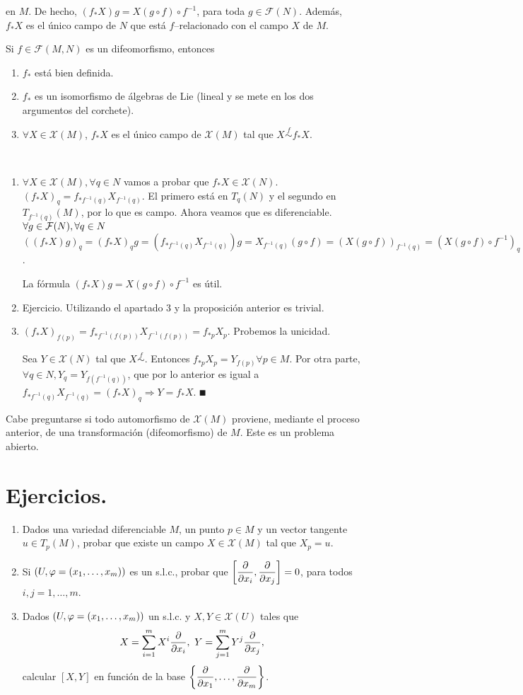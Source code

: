 \documentclass[Cursovd_portada.tex]{subfiles}
\begin{document}
en $M$. De hecho, $(f_*X)g=X(g\circ f)\circ f^{-1}$, para toda
$g\in \mathcal{F}(N)$. Además, $f_*X$ es el único campo de
$N$ que est\'a $f$--relacionado con el campo $X$ de $M$.
\begin{prop}
Si $f\in\mathcal{F}(M,N)$ es un difeomorfismo, entonces 
\begin{enumerate}
\item $f_*$ está bien definida.
\item $f_*$ es un isomorfismo de álgebras de Lie (lineal y se mete en los dos argumentos del corchete).
\item $\forall X\in\mathcal{X}(M)$, $f_*X$ es el único campo de $\mathcal{X}(M)$ tal que $X\overset{f}{\sim} f_*X$.
\end{enumerate}
\end{prop}
\begin{dem}\
\begin{enumerate}
\item $\forall X\in\mathcal{X}(M),\forall q\in N$ vamos a probar que $f_*X\in\mathcal{X}(N)$. $(f_*X)_q=f_{*f^{-1}(q)}X_{f^{-1}(q)}$. El primero está en $T_q(N)$ y el segundo en $T_{f^{-1}(q)}(M)$, por lo que es campo. Ahora veamos que es diferenciable.
$\forall g\in\mathcal{F}(N),\forall q\in N$ $((f_*X)g)_q=(f_*X)_qg=(f_{*f^{-1}(q)}X_{f^{-1}(q)})g=X_{f^{-1}(q)}(g\circ f)=(X(g\circ f))_{f^{-1}(q)}=(X(g\circ f)\circ f^{-1})_q$.

La fórmula $(f_*X)g=X(g\circ f)\circ f^{-1}$ es útil.
\item Ejercicio. Utilizando el apartado 3 y la proposición anterior es trivial.
\item $(f_*X)_{f(p)}=f_{*f^{-1}(f(p))}X_{f^{-1}(f(p))}=f_{*p}X_p$. Probemos la unicidad. 

Sea $Y\in\mathcal{X}(N)$ tal que $X\overset{f}{\sim}$. Entonces $f_{*p}X_p=Y_{f(p)}\forall p\in M$. Por otra parte, $\forall q\in N, Y_q=Y_{f(f^{-1}(q))}$, que por lo anterior es igual a $f_{*f^{-1}(q)}X_{f^{-1}(q)}=(f_*X)_q\Rightarrow Y=f_*X$. $\QED$
\end{enumerate}
\end{dem}
\begin{nota}
{\rm Cabe preguntarse si todo automorfismo de $\mathcal{X}(M)$ proviene, mediante el proceso anterior, de una
transformación (difeomorfismo) de $M$. Este es un problema abierto.}
\end{nota}
\section{Ejercicios.}
\begin{enumerate}
\item Dados una variedad diferenciable $M$, un punto $p\in M$ y un
vector tangente $u\in T_p(M)$, probar que existe un campo
$X\in\mathcal{X}(M)$ tal que $X_p=u$. \item Si $(U,\varphi=(x_1,\dots
,x_m))$ es un s.l.c., probar que
$\left[\displaystyle{\frac{\partial}{\partial x_i}},\displaystyle{\frac{\partial}{\partial x_j}}\right]=0$, para todos $i,j=1,\dots ,m$.
\item Dados $(U,\varphi=(x_1,\dots ,x_m))$ un s.l.c. y
$X,Y\in\mathcal{X}(U)$ tales que
$$X=\sum_{i=1}^mX^i\displaystyle{\frac{\partial}{\partial x_i}},\mbox{ }Y=\sum_{j=1}^mY^j\displaystyle{\frac{\partial}{\partial x_j}},$$
calcular $[X,Y]$ en función de la base $\left\{\displaystyle{\frac{\partial}{\partial x_1}},\dots ,\displaystyle{\frac{\partial}{\partial x_m}}\right\}$.
\end{enumerate}
\end{document}
